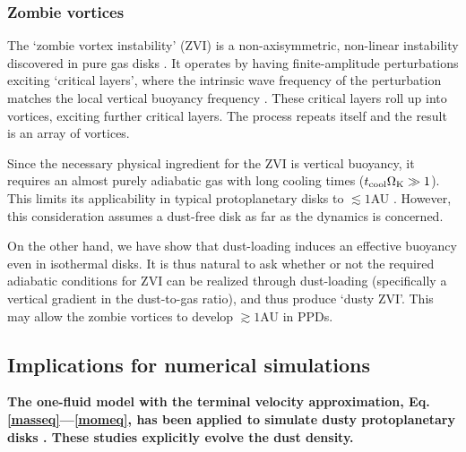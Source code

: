 


\subsubsection{Zombie vortices}

The `zombie vortex instability' (ZVI) is a non-axisymmetric,
non-linear instability discovered in pure gas disks
\citep{marcus15,umurhan16d}. It operates by having finite-amplitude perturbations
exciting `critical layers',  where the intrinsic wave frequency of the
perturbation matches the local vertical buoyancy frequency 
\citep{marcus13}. These critical layers roll 
up into vortices, exciting further critical layers. The process
repeats itself and the result is an array of vortices. 

Since the necessary physical ingredient for the ZVI is vertical
buoyancy, it requires an almost purely adiabatic gas with long cooling times ($t_\mathrm{cool}\Omega_{\rm K}\gg
1$). This limits its applicability in typical protoplanetary disks to 
$\lesssim 1$AU \citep{lesur16, malygin17}. However, this consideration
assumes a dust-free disk as far as the dynamics is concerned. 

On the other hand, we have show that dust-loading induces an effective
buoyancy even in isothermal disks. It is thus natural to ask whether or not
the required adiabatic conditions for ZVI can be realized through
dust-loading (specifically a vertical gradient in the dust-to-gas ratio), 
and thus produce `dusty ZVI'. This may allow the zombie 
vortices to develop $\gtrsim 1$AU in PPDs. 

\subsection{Implications for numerical simulations}\label{dust_sims}
{\bf The one-fluid model with the terminal velocity approximation, Eq. \ref{masseq}---\ref{momeq}, 
has been applied to simulate dusty protoplanetary disks \citep{dipierro15,ragusa17}. These studies 
explicitly evolve the dust density.  
}

